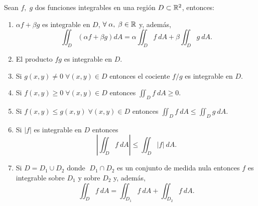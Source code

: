 \begin{propertie}
    Sean $f,\;g$ dos funciones integrables en una regi\'on $D\subset\mathbb{R}^2$, entonces:
    \begin{enumerate}
        \item[i.] $\alpha f+\beta g$ es integrable en $D$, $\forall\;\alpha,\;\beta\in\mathbb{R}$ y, adem\'as,
        \[
            \iint_D \left(\alpha f+\beta g\right)dA=\alpha\iint_D f\:dA+\beta\iint_D g\:dA.
        \]
        \item[ii.] El producto $fg$ es integrable en $D$.
        \item[iii.] Si $g(x,y) \neq 0\;\forall(x,y)\in D$ entonces el cociente $f/g$ es integrable en $D$.
        \item[iv.] Si $f(x,y)\geq 0 \;\forall(x,y)\in D$ entonces  $\iint_D f\:dA\geq0$.
        \item[v.]Si $f(x,y)\leq g(x,y)  \;\forall(x,y)\in D$ entonces $\iint_D f\:dA\leq\iint_D g\:dA.$
        \item[vi.]Si $|f|$ es integrable en $D$ entonces 
        \[
            \left|\iint_D f\:dA\right|\leq\iint_D|f|\:dA.  
        \]    
        \item[vii.] Si $D=D_1\cup D_2$ donde $\;D_1\cap D_2$ es un conjunto de medida nula  entonces   $f$ es integrable sobre $D_1$ y sobre $D_2$ y, adem\'as,  
        \[
            \iint_D f\:dA=\iint_{D_1} f\:dA+\iint_{D_2}f\:dA.    
        \]
    \end{enumerate}
\end{propertie}
